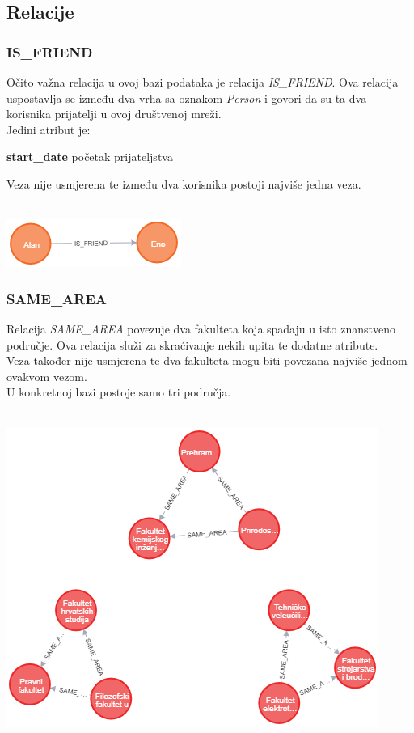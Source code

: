 \documentclass[titlepage, 12pt]{scrartcl}
\begin{document}
\subsection{Relacije}
\subsubsection{IS\_FRIEND}
Očito važna relacija u ovoj bazi podataka je relacija \emph{IS\_FRIEND}. Ova relacija uspostavlja se između dva vrha sa oznakom \emph{Person} i govori da su ta dva korisnika prijatelji u ovoj društvenoj mreži. \\
Jedini atribut je:
\begin{itemize}
\begin{samepage}
    \item \textbf{start\_date} početak prijateljstva
\end{samepage}
\end{itemize}
Veza nije usmjerena te između dva korisnika postoji najviše jedna veza. \\ \\
\begin{center}
    \includegraphics{slike/IS_FRIEND.png}
\end{center}

\subsubsection{SAME\_AREA}
Relacija \emph{SAME\_AREA} povezuje dva fakulteta koja spadaju u isto znanstveno područje. Ova relacija služi za skraćivanje nekih upita te dodatne atribute. \\
Veza također nije usmjerena te dva fakulteta mogu biti povezana najviše jednom ovakvom vezom. \\
U konkretnoj bazi postoje samo tri područja.
\\ \\
\begin{center}
    \includegraphics[scale=0.7]{slike/SAME_AREA.png}\label{fig:SAME_AREA}    
\end{center}
\end{document}
